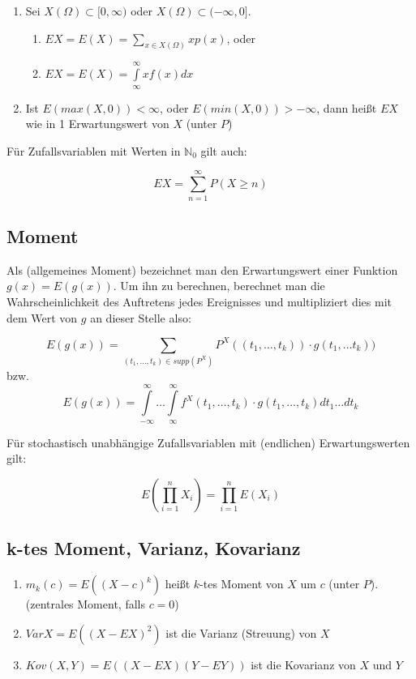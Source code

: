 \documentclass{scrartcl}%
\begin{document}
\begin{enumerate}
	\item{Sei $X(\Omega) \subset [0,\infty)$ oder $X(\Omega) \subset (-\infty,0]$.}
		\begin{enumerate}
			\item{$EX = E(X) = \sum\limits_{x \in X(\Omega)} xp(x)$, oder}
			\item{$EX = E(X) = \int\limits_{\infty}^\infty xf(x)dx$}
		\end{enumerate}
	\item{Ist $E(max(X,0)) < \infty$, oder $E(min(X,0)) > -\infty$, dann heißt $EX$ wie in 1 Erwartungswert von $X$ (unter $P$)}
\end{enumerate}
Für Zufallsvariablen mit Werten in $\mathbb{N}_0$ gilt auch:

\[EX = \sum\limits_{n=1}^\infty P(X \geq n)\]

\subsection{Moment}
Als (allgemeines Moment) bezeichnet man den Erwartungswert einer Funktion $g(x) = E(g(x))$. Um ihn zu berechnen, berechnet man die Wahrscheinlichkeit des Auftretens jedes Ereignisses und multipliziert dies mit dem Wert von $g$ an dieser Stelle also:

\[E(g(x)) = \sum\limits_{(t_1,\ldots,t_k) \in supp (P^X)} P^X((t_1,\ldots,t_k)) \cdot g(t_1,\ldots t_k))\]
bzw.
\[E(g(x)) = \int\limits_{-\infty}^\infty \ldots \int\limits_{\infty}^\infty f^X (t_1,\ldots,t_k) \cdot g(t_1,\ldots,t_k) dt_1\ldots dt_k\]

Für stochastisch unabhängige Zufallsvariablen mit (endlichen) Erwartungswerten gilt:

\[E(\prod\limits_{i=1}^n X_i) = \prod\limits_{i=1}^n E(X_i)\]

\subsection{k-tes Moment, Varianz, Kovarianz}
\begin{enumerate}
	\item{$m_k(c) = E((X-c)^k)$ heißt $k$-tes Moment von $X$ um $c$ (unter $P$). (zentrales Moment, falls $c=0$)}
	\item{$Var X = E((X-EX)^2)$ ist die Varianz (Streuung) von $X$}
	\item{$Kov(X,Y) = E((X-EX)(Y-EY))$ ist die Kovarianz von $X$ und $Y$}
\end{enumerate}
\end{document}
